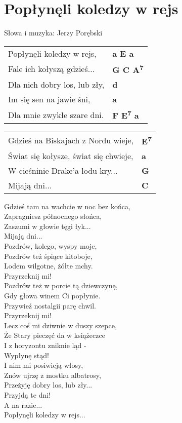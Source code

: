 \section{Popłynęli koledzy w rejs}

Słowa i muzyka: Jerzy Porębski

\vspace{2em}
\begin{tabular}{@{}p{7cm}@{}l@{}}
Popłynęli koledzy w rejs, & \bfseries a E a\\
Fale ich kołyszą gdzieś... & \bfseries G C A\textsuperscript{7}\\
Dla nich dobry los, lub zły, & \bfseries d\\
Im się sen na jawie śni, & \bfseries a\\
Dla mnie zwykłe szare dni. & \bfseries F E\textsuperscript{7} a\\
\end{tabular}

\vspace{1em}
\begin{tabular}{@{}p{7cm}@{}l@{}}
Gdzieś na Biskajach z Nordu wieje, & \bfseries E\textsuperscript{7}\\
Świat się kołysze, świat się chwieje, & \bfseries a\\
W cieśninie Drake'a lodu kry... & \bfseries G\\
Mijają dni... & \bfseries C\\
\end{tabular}

\vspace{1em}
Gdzieś tam na wachcie w noc bez końca, \\
Zapragniesz północnego słońca, \\
Zaszumi w głowie tęgi łyk... \\
Mijają dni... \\

Pozdrów, kolego, wyspy moje, \\
Pozdrów też śpiące kitoboje, \\
Lodem wilgotne, żółte mchy. \\
Przyrzeknij mi! \\

Pozdrów też w porcie tą dziewczynę, \\
Gdy głowa winem Ci popłynie. \\
Przywieź nostalgii parę chwil. \\
Przyrzeknij mi! \\

Lecz coś mi dziwnie w duszy szepce, \\
Że Stary pieczęć da w książeczce \\
I z horyzontu zniknie ląd - \\
Wypłynę stąd! \\

I nim mi posiwieją włosy, \\
Znów ujrzę z mostku albatrosy, \\
Przeżyję dobry los, lub zły... \\
Przyjdą te dni! \\

A na razie... \\

Popłynęli koledzy w rejs... \\

